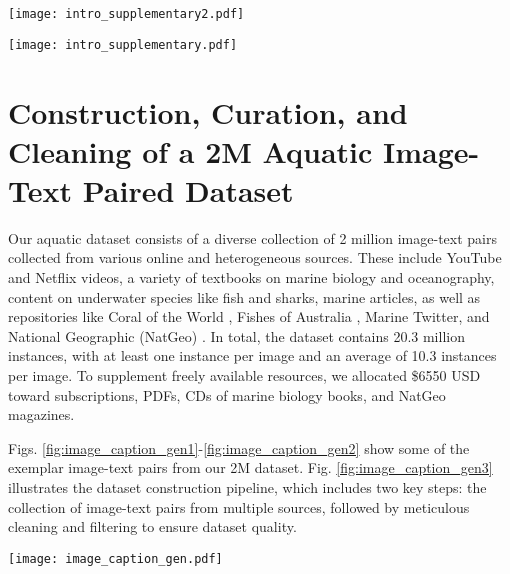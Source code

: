 \begin{figure*}[t!]
\centering
\texttt{[image: intro\_supplementary2.pdf]}
\caption{Exemplary image-text pairs from our 2 million aquatic image-text paired dataset.}
\label{fig:image_caption_gen1}
\end{figure*}

\begin{figure*}[t!]
\centering
\texttt{[image: intro\_supplementary.pdf]}
\caption{Exemplary image-text pairs from our 2 Million aquatic image-text paired dataset.}
\label{fig:image_caption_gen2}
\end{figure*}


\section{Construction, Curation, and Cleaning of a 2M Aquatic Image-Text Paired Dataset}
\label{dataset}
Our aquatic dataset consists of a diverse collection of 2 million image-text pairs collected from various online and heterogeneous sources. 
These include YouTube and Netflix videos, a variety of textbooks on marine biology and oceanography, content on underwater species like fish and sharks, marine articles, as well as repositories like Coral of the World \cite{veron2016corals}, Fishes of Australia \cite{van2014family, schodde1997zoological, merrick2006australasian,shelley2017revision}, Marine Twitter, and National Geographic (NatGeo) \cite{doe2023coral, national_geographic_coral, ng_coral_bleaching, ng_ocean_acidification,ng_great_barrier_reef,ng_coral_conservation,ng_ocean_biodiversity}. 
In total, the dataset contains 20.3 million instances, with at least one instance per image and an average of 10.3 instances per image.
To supplement freely available resources, we allocated \$6550 USD toward subscriptions, PDFs, CDs of marine biology books, and NatGeo magazines. 

\noindent Figs. \ref{fig:image_caption_gen1}-\ref{fig:image_caption_gen2} show some of the exemplar image-text pairs from our 2M dataset.
Fig. \ref{fig:image_caption_gen3} illustrates the dataset construction pipeline, which includes two key steps: the collection of image-text pairs from multiple sources, followed by meticulous cleaning and filtering to ensure dataset quality.

\begin{figure*}[t!]
\centering
\texttt{[image: image\_caption\_gen.pdf]}
\caption{Workflow for constructing and cleaning a diverse, high-quality 2 million aquatic image-text paired dataset for Aquatic-CLIP model pre-training. 
This process involves two main steps: (1) Image-Text Paired Data Gathering from sources such as YouTube and Netflix videos, marine biology textbooks, online repositories, and social media, and (2) Cleaning and Filtering through manual checks, frame extraction, caption refinement, and content validation to ensure dataset accuracy and relevance..}
\label{fig:image_caption_gen3}
\end{figure*}


